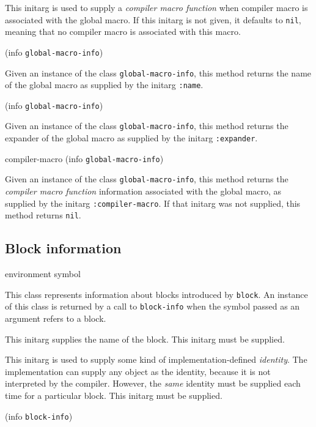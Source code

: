 
This initarg is used to supply a \emph{compiler macro function} when
compiler macro is associated with the global macro.  If this
initarg is not given, it defaults to \texttt{nil}, meaning that no
compiler macro is associated with this macro. 

 {(info {\tt global-macro-info})}

Given an instance of the class \texttt{global-macro-info}, this
method returns the name of the global macro as supplied by the
initarg \texttt{:name}.

 {(info {\tt global-macro-info})}

Given an instance of the class \texttt{global-macro-info}, this
method returns the expander of the global macro as supplied by the
initarg \texttt{:expander}.

\Defmethod compiler-macro {(info {\tt global-macro-info})}

Given an instance of the class \texttt{global-macro-info}, this
method returns the \emph{compiler macro function} information
associated with the global macro, as supplied by the initarg
\texttt{:compiler-macro}.  If that initarg was not supplied, this
method returns \texttt{nil}.

\subsection{Block information}

 {environment symbol}


This class represents information about blocks introduced by
\texttt{block}.  An instance of this class is returned by a call to
\texttt{block-info} when the symbol passed as an argument refers to a
block.


This initarg supplies the name of the block.  This initarg must be
supplied.


This initarg is used to supply some kind of implementation-defined 
\emph{identity}.  The implementation can supply any object as the
identity, because it is not interpreted by the compiler.  However, the
\emph{same} identity must be supplied each time for a particular
block.  This initarg must be supplied. 

 {(info {\tt block-info})}

